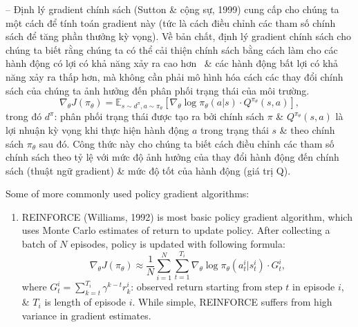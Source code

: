 \documentclass{article}
\begin{document}
\begin{itemize}
\begin{itemize}
\begin{itemize}
            -- Định lý gradient chính sách (Sutton \& cộng sự, 1999) cung cấp cho chúng ta một cách để tính toán gradient này (tức là cách điều chỉnh các tham số chính sách để tăng phần thưởng kỳ vọng). Về bản chất, định lý gradient chính sách cho chúng ta biết rằng chúng ta có thể cải thiện chính sách bằng cách làm cho các hành động có lợi có khả năng xảy ra cao hơn \ \& các hành động bất lợi có khả năng xảy ra thấp hơn, mà không cần phải mô hình hóa cách các thay đổi chính sách của chúng ta ảnh hưởng đến phân phối trạng thái của môi trường. \begin{equation*}
                \nabla_\theta J(\pi_\theta) = \mathbb{E}_{s\sim d^\pi,a\sim\pi_\theta}[\nabla_\theta\log\pi_\theta(a|s)\cdot Q^{\pi_\theta}(s,a)],
            \end{equation*}
            trong đó $d^\pi$: phân phối trạng thái được tạo ra bởi chính sách $\pi$ \& $Q^{\pi_\theta}(s,a)$ là lợi nhuận kỳ vọng khi thực hiện hành động $a$ trong trạng thái $s$ \& theo chính sách $\pi_\theta$ sau đó. Công thức này cho chúng ta biết cách điều chỉnh các tham số chính sách theo tỷ lệ với mức độ ảnh hưởng của thay đổi hành động đến chính sách (thuật ngữ gradient) \& mức độ tốt của hành động (giá trị Q).

            Some of more commonly used policy gradient algorithms:
            \begin{enumerate}
                \item REINFORCE (Williams, 1992) is most basic policy gradient algorithm, which uses Monte Carlo estimates of return to update policy. After collecting a batch of $N$ episodes, policy is updated with following formula:
                \begin{equation*}
                    \nabla_\theta J(\pi_\theta)\approx\frac{1}{N}\sum_{i=1}^N\sum_{t=1}^{T_i} \nabla_\theta\log\pi_\theta(a_t^i|s_t^i)\cdot G_t^i,
                \end{equation*}
                where $G_t^i = \sum_{k=t}^{T_i} \gamma^{k - t}r_k^i$: observed return starting from step $t$ in episode $i$, \& $T_i$ is length of episode $i$. While simple, REINFORCE suffers from high variance in gradient estimates.


\end{enumerate}
\end{itemize}
\end{itemize}
\end{itemize}
\end{document}
